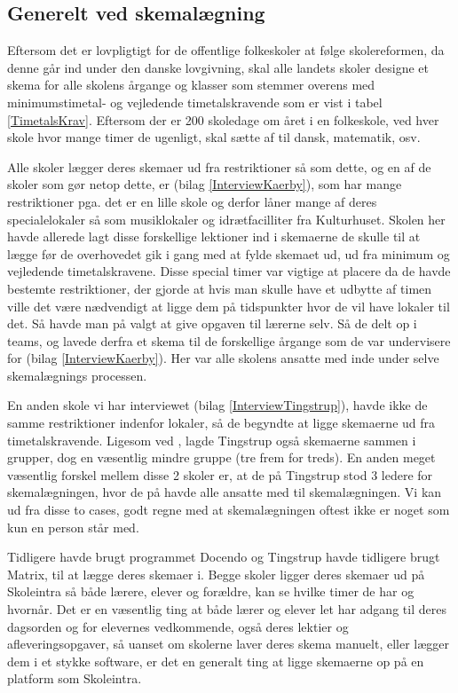 \subsection{Generelt ved skemalægning}
Eftersom det er lovpligtigt for de offentlige folkeskoler at følge skolereformen, da denne går ind under den danske lovgivning, skal alle landets skoler designe et skema for alle skolens årgange og klasser som stemmer overens med minimumstimetal- og vejledende timetalskravende som er vist i tabel \ref{TimetalsKrav}. Eftersom der er 200 skoledage om året i en folkeskole\cite{elevers_timetal}, ved hver skole hvor mange timer de ugenligt, skal sætte af til dansk, matematik, osv. 









Alle skoler lægger deres skemaer ud fra restriktioner så som dette, og en af de skoler som gør netop dette, er \school (bilag \ref{InterviewKaerby}), som har mange restriktioner pga. det er en lille skole og derfor låner mange af deres specialelokaler så som musiklokaler og idrætfacilliter fra Kulturhuset. Skolen her havde allerede lagt disse forskellige lektioner ind i skemaerne de skulle til at lægge før de overhovedet gik i gang med at fylde skemaet ud, ud fra minimum og vejledende timetalskravene. Disse special timer var vigtige at placere da de havde bestemte restriktioner, der gjorde at hvis man skulle have et udbytte af timen ville det være nædvendigt at ligge dem på tidspunkter hvor de vil have lokaler til det. Så havde man på \school valgt at give opgaven til lærerne selv. Så de delt op i teams, og lavede derfra et skema til de forskellige årgange som de var undervisere for (bilag \ref{InterviewKaerby}). Her var alle skolens ansatte med inde under selve skemalægnings processen. 

En anden skole vi har interviewet (bilag \ref{InterviewTingstrup}), havde ikke de samme restriktioner indenfor lokaler, så de begyndte at ligge skemaerne ud fra timetalskravende. Ligesom ved \school, lagde Tingstrup også skemaerne sammen i grupper, dog en væsentlig mindre gruppe (tre frem for treds). En anden meget væsentlig forskel mellem disse 2 skoler er, at de på Tingstrup stod 3 ledere for skemalægningen, hvor de på \school havde alle ansatte med til skemalægningen. Vi kan ud fra disse to cases, godt regne med at skemalægningen oftest ikke er noget som kun en person står med.

Tidligere havde \school brugt programmet Docendo og Tingstrup havde tidligere brugt Matrix, til at lægge deres skemaer i. Begge skoler ligger deres skemaer ud på Skoleintra så både lærere, elever og forældre, kan se hvilke timer de har og hvornår. Det er en væsentlig ting at både lærer og elever let har adgang til deres dagsorden og for elevernes vedkommende, også deres lektier og afleveringsopgaver, så uanset om skolerne laver deres skema manuelt, eller lægger dem i et stykke software, er det en generalt ting at ligge skemaerne op på en platform som Skoleintra.